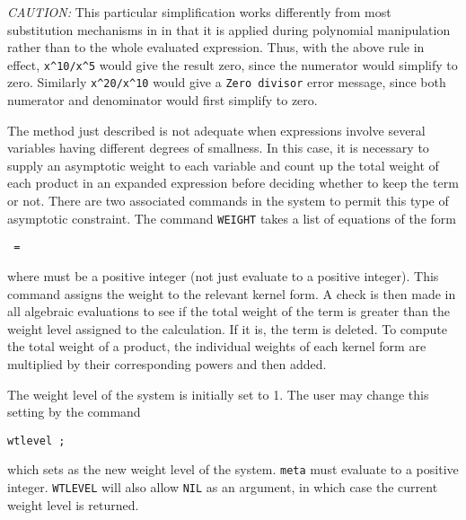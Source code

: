 \textit{CAUTION:}  This particular simplification works differently from most
substitution mechanisms in {\REDUCE} in that it is applied during
polynomial manipulation rather than to the whole evaluated expression.
Thus, with the above rule in effect, 
\texttt{x\textasciicircum 10/x\textasciicircum 5} would give the
result zero, since the numerator would simplify to zero.  Similarly
\texttt{x\textasciicircum 20/x\textasciicircum 10} would give a 
\texttt{Zero divisor} error message,
since both numerator and denominator would first simplify to zero.

\hypertarget{command:WEIGHT}{}
The method just described is not adequate when expressions involve several
variables having different degrees of smallness. In this case, it is
necessary to supply an asymptotic weight to each variable and count up the
total weight of each product in an expanded expression before deciding
whether to keep the term or not. There are two associated commands in the
system to permit this type of asymptotic constraint. The command 
\texttt{WEIGHT}
takes a list of equations of the form
\begin{syntax}
  \texttt{ = }
\end{syntax}
where  must be a positive integer (not just evaluate to a
positive integer).  This command assigns the weight  to the
relevant kernel form.  A check is then made in all algebraic evaluations
to see if the total weight of the term is greater than the weight level
assigned to the calculation.  If it is, the term is deleted.  To compute
the total weight of a product, the individual weights of each kernel form
are multiplied by their corresponding powers and then added.

\hypertarget{command:WTLEVEL}{}
The weight level of the system is initially set to 1. The user may change
this setting by the command
\begin{syntax}
        \texttt{wtlevel }\texttt{;}
\end{syntax}
which sets  as the new weight level of the system.
\texttt{meta} must evaluate to a positive integer.  \texttt{WTLEVEL} will also
allow \texttt{NIL} as an argument, in which case the current weight level is returned.

